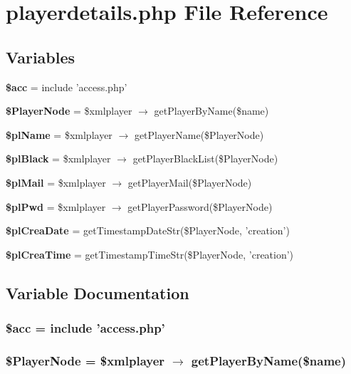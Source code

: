 \section{playerdetails.php File Reference}
\label{playerdetails_8php}


\subsection*{Variables}
\begin{CompactItemize}
\item 
{\bf \$acc} = include 'access.php'
\item 
{\bf \$Player\-Node} = \$xmlplayer $\rightarrow$ get\-Player\-By\-Name(\$name)
\item 
{\bf \$pl\-Name} = \$xmlplayer $\rightarrow$ get\-Player\-Name(\$Player\-Node)
\item 
{\bf \$pl\-Black} = \$xmlplayer $\rightarrow$ get\-Player\-Black\-List(\$Player\-Node)
\item 
{\bf \$pl\-Mail} = \$xmlplayer $\rightarrow$ get\-Player\-Mail(\$Player\-Node)
\item 
{\bf \$pl\-Pwd} = \$xmlplayer $\rightarrow$ get\-Player\-Password(\$Player\-Node)
\item 
{\bf \$pl\-Crea\-Date} = get\-Timestamp\-Date\-Str(\$Player\-Node, 'creation')
\item 
{\bf \$pl\-Crea\-Time} = get\-Timestamp\-Time\-Str(\$Player\-Node, 'creation')
\end{CompactItemize}


\subsection{Variable Documentation}
\subsubsection{\setlength{\rightskip}{0pt plus 5cm}\$acc = include 'access.php'}\label{playerdetails_8php_542926c588a05eb69553d79c83cf73da}


\subsubsection{\setlength{\rightskip}{0pt plus 5cm}\$Player\-Node = \$xmlplayer $\rightarrow$ get\-Player\-By\-Name(\$name)}\label{playerdetails_8php_90668b8131a1c418248aef66339e32d6}


